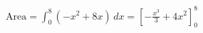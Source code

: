 \documentclass[preview]{standalone}
\begin{document}
\begin{align*}
\text{Area} = \int_{0}^{8} (-x^2 + 8x) \, dx = \left[-\frac{x^3}{3} + 4x^2\right]_{0}^{8}
\end{align*}
\end{document}
